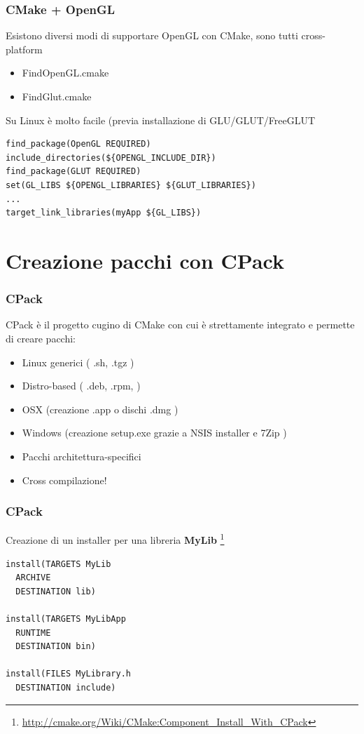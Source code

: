 \documentclass[10pt] {beamer}
\begin{document}
\begin{frame}[fragile]
 \frametitle{CMake + OpenGL}
Esistono diversi modi di supportare OpenGL con CMake, sono tutti cross-platform
\begin{itemize}
 \item FindOpenGL.cmake
 \item FindGlut.cmake
\end{itemize}

Su Linux è molto facile (previa installazione di GLU/GLUT/FreeGLUT
\begin{verbatim}
find_package(OpenGL REQUIRED)
include_directories(${OPENGL_INCLUDE_DIR})
find_package(GLUT REQUIRED)
set(GL_LIBS ${OPENGL_LIBRARIES} ${GLUT_LIBRARIES})
...
target_link_libraries(myApp ${GL_LIBS})
\end{verbatim}
\end{frame}


\section{Creazione pacchi con CPack}
\begin{frame}
\frametitle{CPack}
CPack è il progetto cugino di CMake con cui è strettamente integrato e permette di creare pacchi:
\begin{itemize}
\item Linux generici ( .sh, .tgz )
\item Distro-based ( .deb, .rpm, )
\item OSX (creazione .app o dischi .dmg )
\item Windows (creazione setup.exe grazie a NSIS installer e 7Zip )
\end{itemize}
\begin{itemize}
\item Pacchi architettura-specifici
\item Cross compilazione!
\end{itemize}
\end{frame}

\begin{frame}[fragile]
\frametitle{CPack}
Creazione di un installer per una libreria  \textbf{MyLib} \footnote{\url{http://cmake.org/Wiki/CMake:Component_Install_With_CPack}}
\begin{verbatim}
install(TARGETS MyLib 
  ARCHIVE
  DESTINATION lib)

install(TARGETS MyLibApp
  RUNTIME
  DESTINATION bin)

install(FILES MyLibrary.h
  DESTINATION include)
\end{verbatim}
\end{frame}
\end{document}
